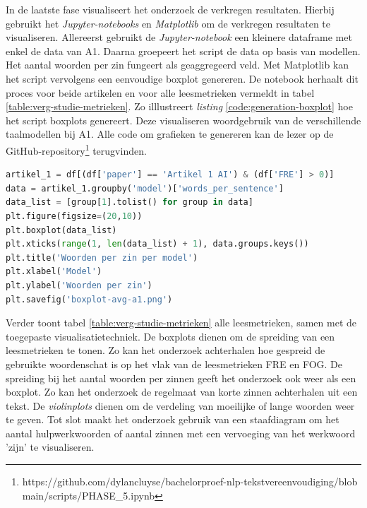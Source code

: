 In de laatste fase visualiseert het onderzoek de verkregen resultaten. Hierbij gebruikt het \textit{Jupyter-notebooks} en \textit{Matplotlib} om de verkregen resultaten te visualiseren. Allereerst gebruikt de \textit{Jupyter-notebook} een kleinere dataframe met enkel de data van A1. Daarna groepeert het script de data op basis van modellen. Het aantal woorden per zin fungeert als geaggregeerd veld. Met Matplotlib kan het script vervolgens een eenvoudige boxplot genereren. De notebook herhaalt dit proces voor beide artikelen en voor alle leesmetrieken vermeldt in tabel \ref{table:verg-studie-metrieken}. Zo illlustreert \textit{listing} \ref{code:generation-boxplot} hoe het script boxplots genereert. Deze visualiseren woordgebruik van de verschillende taalmodellen bij A1. Alle code om grafieken te genereren kan de lezer op de GitHub-repository\footnote{https://github.com/dylancluyse/bachelorproef-nlp-tekstvereenvoudiging/blob main/scripts/PHASE\_5.ipynb} terugvinden. 

\begin{lstlisting}[language=Python, caption={Code om een boxplot voor het aantal woorden per zin te genereren.}, label={code:generation-boxplot}]	
artikel_1 = df[(df['paper'] == 'Artikel 1 AI') & (df['FRE'] > 0)]
data = artikel_1.groupby('model')['words_per_sentence']
data_list = [group[1].tolist() for group in data]
plt.figure(figsize=(20,10))
plt.boxplot(data_list)
plt.xticks(range(1, len(data_list) + 1), data.groups.keys())
plt.title('Woorden per zin per model')
plt.xlabel('Model')
plt.ylabel('Woorden per zin')
plt.savefig('boxplot-avg-a1.png')
\end{lstlisting}

Verder toont tabel \ref{table:verg-studie-metrieken} alle leesmetrieken, samen met de toegepaste visualisatietechniek. De boxplots dienen om de spreiding van een leesmetrieken te tonen. Zo kan het onderzoek achterhalen hoe gespreid de gebruikte woordenschat is op het vlak van de leesmetrieken FRE en FOG. De spreiding bij het aantal woorden per zinnen geeft het onderzoek ook weer als een boxplot. Zo kan het onderzoek de regelmaat van korte zinnen achterhalen uit een tekst. De \textit{violinplots} dienen om de verdeling van moeilijke of lange woorden weer te geven. Tot slot maakt het onderzoek gebruik van een staafdiagram om het aantal hulpwerkwoorden of aantal zinnen met een vervoeging van het werkwoord 'zijn' te visualiseren.

